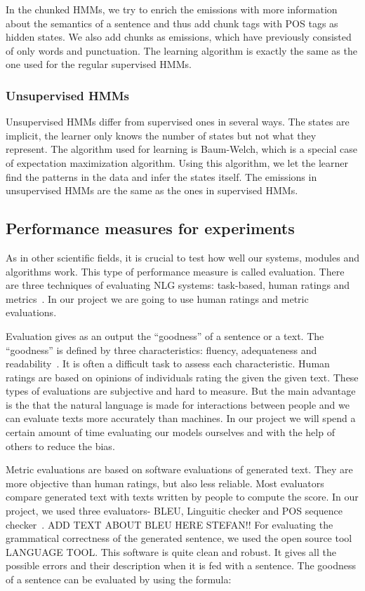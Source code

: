 \documentclass[a4paper,12pt]{article}
\begin{document}
In the chunked HMMs, we try to enrich the emissions with more
information about the semantics of a sentence and thus add chunk tags with POS
tags as hidden states. We also add chunks as emissions, which have previously
consisted of only words and punctuation. The learning algorithm is exactly the
same as the one used for the regular supervised HMMs.

\subsubsection{Unsupervised HMMs}
Unsupervised HMMs differ from supervised ones in several ways. The states are
implicit, the learner only knows the number of states but not what they
represent. The algorithm used for learning is Baum-Welch, which is a special
case of expectation maximization algorithm. Using this algorithm, we let the
learner find the patterns in the data and infer the states itself. The emissions
in unsupervised HMMs are the same as the ones in supervised HMMs.


\subsection {Performance measures for experiments}

As in other scientific fields, it is crucial to test how well our systems,
modules and algorithms work. This type of performance measure is called
evaluation. There are three techniques of evaluating NLG systems: task-based,
human ratings and metrics~\cite{evalnlg}. In our project we are going to use
human ratings and metric evaluations.

Evaluation gives as an output the ``goodness'' of a sentence or a text. The
``goodness'' is defined by three characteristics: fluency, adequateness and
readability~\cite{evalmethods}. It is often a difficult task to assess each
characteristic.
Human ratings are based on opinions of individuals rating the given the given
text. These types of evaluations are subjective and hard to measure. But the
main advantage is the that the natural language is made for interactions between
people and we can evaluate texts more accurately than machines. In our project
we will spend a certain amount of time evaluating our models ourselves and with
the help of others to reduce the bias.

Metric evaluations are based on software evaluations of generated text. They are
more objective than human ratings, but also less reliable. Most evaluators
compare generated text with texts written by people to compute the score. In our
project, we used three evaluators- BLEU, Linguitic checker and POS sequence checker~\cite{autoeval}.
ADD TEXT ABOUT BLEU HERE STEFAN!!
For evaluating the grammatical correctness of the generated sentence, we used the
open source tool LANGUAGE TOOL. This software is quite clean and robust. It gives 
all the possible errors and their description when it is fed with a sentence. The 
goodness of a sentence can be evaluated by using the formula: 
\end{document}
